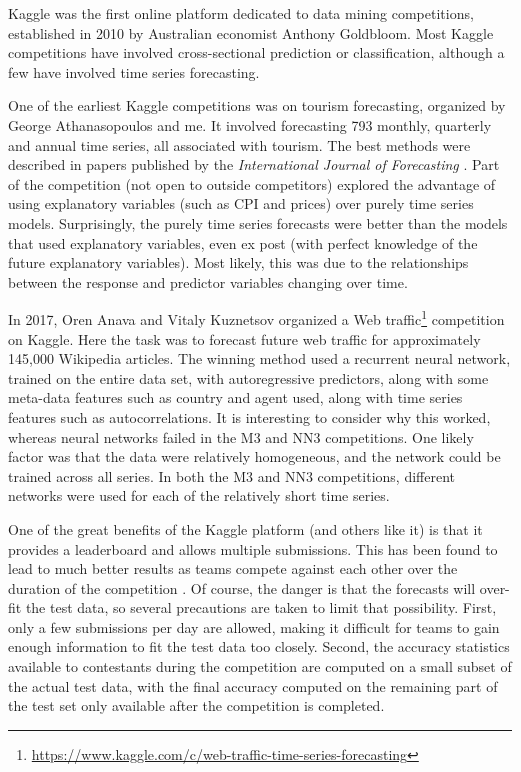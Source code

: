 \documentclass[11pt,a4paper,]{article}
\begin{document}
Kaggle was the first online platform dedicated to data mining competitions, established in 2010 by Australian economist Anthony Goldbloom. Most Kaggle competitions have involved cross-sectional prediction or classification, although a few have involved time series forecasting.

One of the earliest Kaggle competitions was on tourism forecasting, organized by George Athanasopoulos and me. It involved forecasting 793 monthly, quarterly and annual time series, all associated with tourism. The best methods were described in papers published by the \emph{International Journal of Forecasting} \autocite{AHSW11}. Part of the competition (not open to outside competitors) explored the advantage of using explanatory variables (such as CPI and prices) over purely time series models. Surprisingly, the purely time series forecasts were better than the models that used explanatory variables, even ex post (with perfect knowledge of the future explanatory variables). Most likely, this was due to the relationships between the response and predictor variables changing over time.

In 2017, Oren Anava and Vitaly Kuznetsov organized a Web traffic\footnote{\url{https://www.kaggle.com/c/web-traffic-time-series-forecasting}} competition on Kaggle. Here the task was to forecast future web traffic for approximately 145,000 Wikipedia articles. The winning method used a recurrent neural network, trained on the entire data set, with autoregressive predictors, along with some meta-data features such as country and agent used, along with time series features such as autocorrelations. It is interesting to consider why this worked, whereas neural networks failed in the M3 and NN3 competitions. One likely factor was that the data were relatively homogeneous, and the network could be trained across all series. In both the M3 and NN3 competitions, different networks were used for each of the relatively short time series.

One of the great benefits of the Kaggle platform (and others like it) is that it provides a leaderboard and allows multiple submissions. This has been found to lead to much better results as teams compete against each other over the duration of the competition \autocite{AH11}. Of course, the danger is that the forecasts will over-fit the test data, so several precautions are taken to limit that possibility. First, only a few submissions per day are allowed, making it difficult for teams to gain enough information to fit the test data too closely. Second, the accuracy statistics available to contestants during the competition are computed on a small subset of the actual test data, with the final accuracy computed on the remaining part of the test set only available after the competition is completed.
\end{document}
